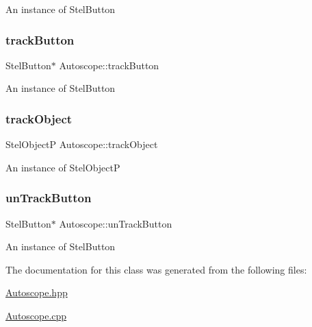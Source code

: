 An instance of Stel\+Button \mbox{\label{class_autoscope_a816e3212639b4204e9917704e02b0d09}} 
\subsubsection{\texorpdfstring{trackButton}{trackButton}}
{\footnotesize\ttfamily Stel\+Button$\ast$ Autoscope\+::track\+Button\hspace{0.3cm}{\ttfamily [private]}}

An instance of Stel\+Button \mbox{\label{class_autoscope_a170fbbc7b2a719517912aa3614727021}} 
\subsubsection{\texorpdfstring{trackObject}{trackObject}}
{\footnotesize\ttfamily Stel\+ObjectP Autoscope\+::track\+Object\hspace{0.3cm}{\ttfamily [private]}}

An instance of Stel\+ObjectP \mbox{\label{class_autoscope_a5d3be6a8522dc18b921936b57c8e661c}} 
\subsubsection{\texorpdfstring{unTrackButton}{unTrackButton}}
{\footnotesize\ttfamily Stel\+Button$\ast$ Autoscope\+::un\+Track\+Button\hspace{0.3cm}{\ttfamily [private]}}

An instance of Stel\+Button 

The documentation for this class was generated from the following files\+:\begin{DoxyCompactItemize}
\item 
\mbox{\hyperlink{_autoscope_8hpp}{Autoscope.\+hpp}}\item 
\mbox{\hyperlink{_autoscope_8cpp}{Autoscope.\+cpp}}\end{DoxyCompactItemize}
